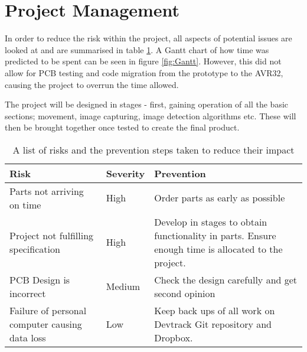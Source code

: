 \section{Project Management}
In order to reduce the risk within the project, all aspects of potential issues are looked at and are summarised in table \ref{tab:risk}. A Gantt chart of how time was predicted to be spent can be seen in figure \ref{fig:Gantt}. However, this did not allow for PCB testing and code migration from the prototype to the AVR32, causing the project to overrun the time allowed.

The project will be designed in stages - first, gaining operation of all the basic sections; movement, image capturing, image detection algorithms etc. These will then be brought together once tested to create the final product. 
\begin{table}
\begin{tabular}{|p{6cm}|p{2cm}|p{6cm}|}\hline
Risk						&	Severity	&	Prevention \\ \hline
Parts not arriving on time	&	High		&	Order parts as early as possible \\
Project not fulfilling specification				&	High		&	Develop in stages to obtain functionality in parts. Ensure enough time is allocated to the project.	\\
PCB Design is incorrect		&	Medium		&	Check the design carefully and get second opinion \\
Failure of personal computer causing data loss & Low	& 	Keep back ups of all work on Devtrack Git repository and Dropbox.\\

\hline
\end{tabular}
\caption{A list of risks and the prevention steps taken to reduce their impact}
\label{tab:risk}
\end{table}
